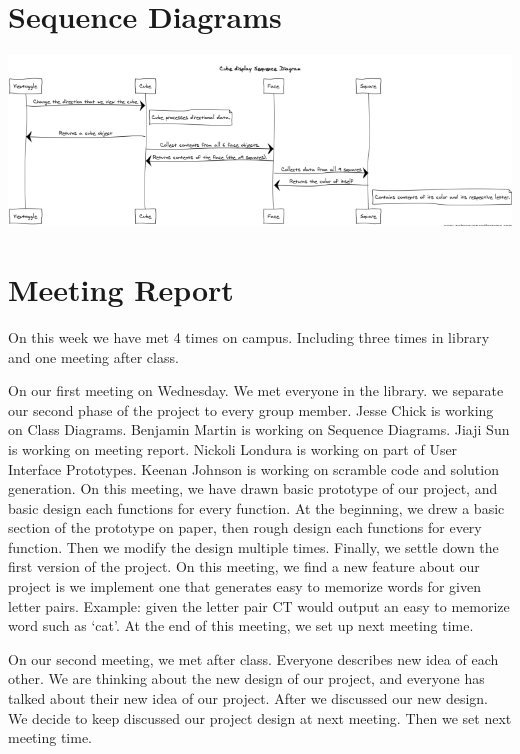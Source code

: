 \documentclass[12pt]{article}
\begin{document}
\section{Sequence Diagrams}

	\includegraphics[width = \textwidth]{sequence.PNG}

\section{Meeting Report}

\par
On this week we have met 4 times on campus. Including three times in library and one meeting after class. \\

\par
On our first meeting on Wednesday. We met everyone in the library. we separate our second phase of the project to every group member. Jesse Chick is working on Class Diagrams. Benjamin Martin is working on Sequence Diagrams. Jiaji Sun is working on meeting report. Nickoli Londura is working on part of User Interface Prototypes. Keenan Johnson is working on scramble code and solution generation. On this meeting, we have drawn basic prototype of our project, and basic design each functions for every function. At the beginning, we drew a basic section of the prototype on paper, then rough design each functions for every function. Then we modify the design multiple times. Finally, we settle down the first version of the project. On this meeting, we find a new feature about our project is we implement one that generates easy to memorize words for given letter pairs. Example: given the letter pair CT would output an easy to memorize word such as ‘cat’. At the end of this meeting, we set up next meeting time. \\

\par
On our second meeting, we met after class. Everyone describes new idea of each other. We are thinking about the new design of our project, and everyone has talked about their new idea of our project. After we discussed our new design. We decide to keep discussed our project design at next meeting. Then we set next meeting time. \\
\end{document}
